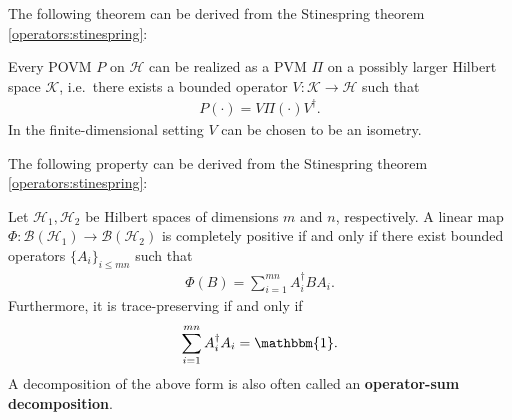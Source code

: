     The following theorem can be derived from the Stinespring theorem \ref{operators:stinespring}:
    \begin{theorem}
        Every POVM $P$ on $\mathcal{H}$ can be realized as a PVM $\Pi$ on a possibly larger Hilbert space $\mathcal{K}$, i.e.~there exists a bounded operator $V:\mathcal{K}\rightarrow\mathcal{H}$ such that
        \begin{gather}
            P(\cdot) = V\Pi(\cdot)V^\dagger.
        \end{gather}
        In the finite-dimensional setting $V$ can be chosen to be an isometry.
    \end{theorem}


    The following property can be derived from the Stinespring theorem \ref{operators:stinespring}:
    \begin{property}\label{qc:kraus}
        Let $\mathcal{H}_1,\mathcal{H}_2$ be Hilbert spaces of dimensions $m$ and $n$, respectively. A linear map $\Phi:\mathcal{B}(\mathcal{H}_1)\rightarrow\mathcal{B}(\mathcal{H}_2)$ is completely positive if and only if there exist bounded operators $\{A_i\}_{i\leq mn}$ such that
        \begin{gather}
            \Phi(B) = \sum_{i=1}^{mn}A^\dag_iBA_i.
        \end{gather}
        Furthermore, it is trace-preserving if and only if
        \begin{gather}
            \sum_{i=1}^{mn}A^\dag_iA_i = \mathbbm{1}.
        \end{gather}
        A decomposition of the above form is also often called an \textbf{operator-sum decomposition}.
    \end{property}